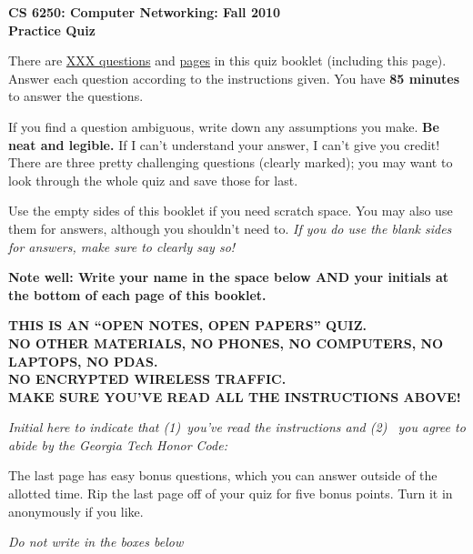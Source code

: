 \documentclass[11pt]{article}
\newcounter{answer}
\begin{document}
\begin{center}
{\Large{\bf CS 6250: Computer Networking: Fall 2010} \\
 \vspace{.15in} \Huge{\bf Practice Quiz}} 
\vspace{.2in}

\begin{boxedminipage}[h]{6in}
There are \underline{XXX questions} and
  \underline{\pageref{lastpage} pages} in this quiz booklet (including
  this page).  Answer each question according to the instructions given.
  You have {\bf 85 minutes} to answer the questions.



\vspace{.1in} 
If you find a question ambiguous, write down any
assumptions you make.  {\bf Be neat and legible.}  If I can't
understand your answer, I can't give you credit!  There are three pretty
challenging questions (clearly marked); you may want to look through the
whole quiz and save those for last.

\vspace{.1in} 
Use the empty sides of this booklet if you need scratch space.  You
may also use them for answers, although you shouldn't need to.  {\em If you
do use the blank sides for answers, make sure to clearly say so!}

\vspace{.1in} 
{\bf Note well: Write your name in the space below AND your initials at the bottom of each
page of this booklet.}

\begin{center}{\bf THIS IS AN ``OPEN NOTES, OPEN PAPERS'' QUIZ.\\
NO OTHER MATERIALS, NO PHONES, NO COMPUTERS, NO LAPTOPS, NO PDAS.\\
NO ENCRYPTED WIRELESS TRAFFIC. \\
MAKE SURE YOU'VE READ ALL THE INSTRUCTIONS ABOVE!}
\end{center}
{\em Initial here to indicate that (1)~you've read the instructions and (2)~
you agree to abide by the Georgia Tech Honor Code: }



\vspace{.1in} The last page has easy bonus questions, which you can
answer outside of the allotted time.  Rip the last page off of your
quiz for five bonus points.  Turn it in anonymously if you like.

\end{boxedminipage}
\end{center}
\vspace*{0.25in}
\begin{center}
{\it Do not write in the boxes below}
\end{center}
\end{document}
